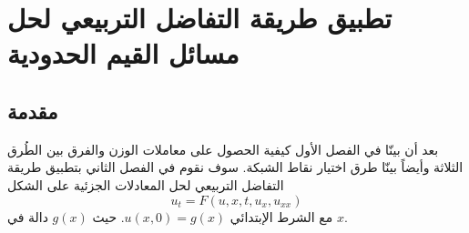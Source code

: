 \chapter{تطبيق طريقة التفاضل التربيعي لحل مسائل القيم الحدودية}

\section[مقدمة]{مقدمة }
بعد أن بينّا في الفصل الأول كيفية الحصول على معاملات الوزن والفرق بين الطُرق الثلاثة وأيضاً بينّا طرق اختيار نقاط الشبكة. سوف نقوم في الفصل الثاني بتطبيق طريقة التفاضل التربيعي لحل المعادلات الجزئية على الشكل 
\begin{equation}\label{eq:one_dim_diff_eq}
	u_t=F(u,x,t,u_x,u_{xx})
\end{equation}
مع الشرط الإبتدائي $u(x,0)=g(x)$. حيث $g(x)$ دالة في $x$.
